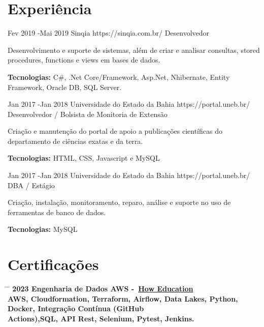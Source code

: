 \documentclass{article}
\begin{document}
\section*{Experiência}

\begin{job}
	{Fev 2019 -}{Mai 2019}
	{Sinqia}
	{https://sinqia.com.br/}
	{Desenvolvedor}%
	{Desenvolvimento e suporte de sistemas, além de criar e analisar consultas, stored procedures, functions e views em bases de dados.\\
		\rule{0mm}{5mm}\textbf{Tecnologias:} C\#, {.Net} Core/Framework, Asp.Net, Nhibernate, Entity Framework, Oracle DB, SQL Server.}
\end{job}

\begin{job}
	{Jan 2017 -}{Jan 2018}
	{Universidade do Estado da Bahia}
	{https://portal.uneb.br/}
	{Desenvolvedor / Bolsista de Monitoria de Extensão}%
	{Criação e manutenção do portal de apoio a publicações científicas do departamento de ciências exatas e da terra.\\
		\rule{0mm}{5mm}\textbf{Tecnologias:} HTML, CSS, Javascript e MySQL}
\end{job}

\begin{job}
	{Jan 2017 -}{Jan 2018}
	{Universidade do Estado da Bahia}
	{https://portal.uneb.br/}
	{DBA / Estágio}%
	{Criação, instalação, monitoramento, reparo, análise e suporte no uso de ferramentas de banco de dados.\\
		\rule{0mm}{5mm}\textbf{Tecnologias:} MySQL}
\end{job}

\section*{Certificações}

\begin{tabbing}
	\hspace{2cm} \= \hspace{4cm} \= \kill
	\bf{2023} \> Engenharia de Dados AWS -~\href{https://howedu.com.br/}{How Education} \\
	AWS, Cloudformation, Terraform, Airflow, Data Lakes, Python, Docker, Integração Contínua (GitHub\\ Actions),SQL, API Rest, Selenium, Pytest, Jenkins. \\
\end{tabbing}
\end{document}

